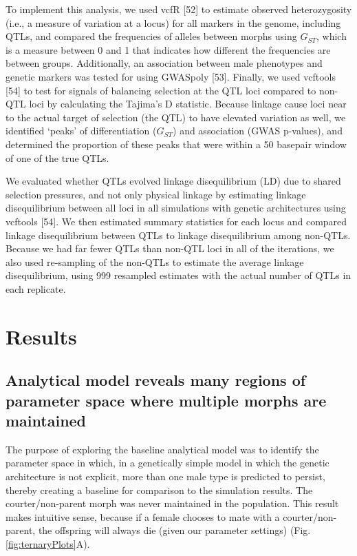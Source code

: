 \documentclass[
  11pt,
  a4paper,
]{article}
\begin{document}
To implement this analysis, we used vcfR
{[}52{]} to estimate observed heterozygosity
(i.e., a measure of variation at a locus) for all markers in the genome,
including QTLs, and compared the frequencies of alleles between morphs
using \(G_{ST}\), which is a measure between 0 and 1 that indicates how
different the frequencies are between groups. Additionally, an
association between male phenotypes and genetic markers was tested for
using GWASpoly {[}53{]}. Finally, we
used vcftools {[}54{]} to test for signals of
balancing selection at the QTL loci compared to non-QTL loci by
calculating the Tajima's D statistic. Because linkage cause loci near to
the actual target of selection (the QTL) to have elevated variation as
well, we identified `peaks' of differentiation (\(G_{ST}\)) and
association (GWAS p-values), and determined the proportion of these
peaks that were within a 50 basepair window of one of the true QTLs.

We evaluated whether QTLs evolved linkage disequilibrium (LD) due to
shared selection pressures, and not only physical linkage by estimating
linkage disequilibrium between all loci in all simulations with genetic
architectures using vcftools {[}54{]}. We then
estimated summary statistics for each locus and compared linkage
disequilibrium between QTLs to linkage disequilibrium among non-QTLs.
Because we had far fewer QTLs than non-QTL loci in all of the
iterations, we also used re-sampling of the non-QTLs to estimate the
average linkage disequilibrium, using 999 resampled estimates with the
actual number of QTLs in each replicate.

\hypertarget{results}{%
\section{Results}\label{results}}

\hypertarget{analytical-model-reveals-many-regions-of-parameter-space-where-multiple-morphs-are-maintained}{%
\subsection{Analytical model reveals many regions of parameter space where multiple morphs are maintained}\label{analytical-model-reveals-many-regions-of-parameter-space-where-multiple-morphs-are-maintained}}

The purpose of exploring the baseline analytical model was to identify
the parameter space in which, in a genetically simple model in which the
genetic architecture is not explicit, more than one male type is
predicted to persist, thereby creating a baseline for comparison to the
simulation results. The courter/non-parent morph was never maintained in
the population. This result makes intuitive sense, because if a female
chooses to mate with a courter/non-parent, the offspring will always die
(given our parameter settings) (Fig. \ref{fig:ternaryPlots}A).
\end{document}
